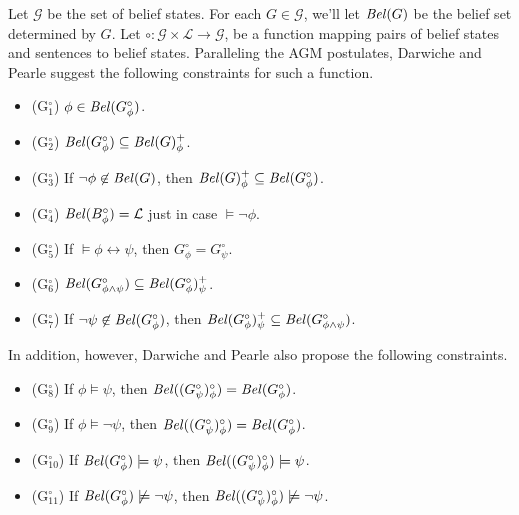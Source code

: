 Let $\mathcal{G}$ be the set of belief states.
For each $G \in \mathcal{G}$, we'll let $\text{\textit{Bel}}(G)$ be the belief set determined by $G$.
Let $\circ: \mathcal{G} \times \mathcal{L} \rightarrow \mathcal{G}$, be a function mapping pairs of belief states and sentences to belief states.
Paralleling the AGM postulates, Darwiche and Pearle suggest the following constraints for such a function.
\begin{itemize}
\item[](G$^\circ_1$) \quad $\phi \in \text{\textit{Bel}}(G^\circ_\phi)$.
\item[](G$^\circ_2$) \quad $\text{\textit{Bel}}(G^\circ_\phi) \subseteq \text{\textit{Bel}}(G)^+_\phi$.
\item[](G$^\circ_3$) \quad If $\lnot \phi \not \in \text{\textit{Bel}}(G)$, then $\text{\textit{Bel}}(G)^+_\phi \subseteq \text{\textit{Bel}}(G^\circ_\phi)$.
\item[](G$^\circ_4$) \quad $\text{\textit{Bel}}(B^\circ_\phi) = \mathcal{L}$ just in case $ \models \lnot \phi$.
\item[](G$^\circ_5$) \quad If $\models \phi \leftrightarrow \psi$, then $G^\circ_\phi = G^\circ_\psi$.
\item[](G$^\circ_6$) \quad $\text{\textit{Bel}}(G^\circ_{\phi \wedge \psi}) \subseteq \text{\textit{Bel}}(G^\circ_\phi)^+_\psi$.
\item[](G$^\circ_7$) \quad If $\lnot \psi \not \in \text{\textit{Bel}}(G^\circ_\phi)$, then $\text{\textit{Bel}}(G^\circ_\phi)^+_\psi \subseteq \text{\textit{Bel}}(G^\circ_{\phi \wedge \psi})$.
\end{itemize}
In addition, however, Darwiche and Pearle also propose the following constraints.
\begin{itemize}
\item[](G$^\circ_8$) \quad If $\phi \models \psi$, then $\text{\textit{Bel}}((G^\circ_\psi)^\circ_\phi) = \text{\textit{Bel}}(G^\circ_\phi)$.
\item[](G$^\circ_9$) \quad If $\phi \models \lnot \psi$, then $\text{\textit{Bel}}((G^\circ_\psi)^\circ_\phi) = \text{\textit{Bel}}(G^\circ_\phi)$.
\item[](G$^\circ_{10}$) \quad If $\text{\textit{Bel}}(G^\circ_\phi) \models \psi$, then $\text{\textit{Bel}}((G^\circ_\psi)^\circ_\phi) \models \psi$.
\item[](G$^\circ_{11}$) \quad If  $\text{\textit{Bel}}(G^\circ_\phi) \not \models \lnot \psi$, then $\text{\textit{Bel}}((G^\circ_\psi)^\circ_\phi) \not \models \lnot \psi$.
\end{itemize}



